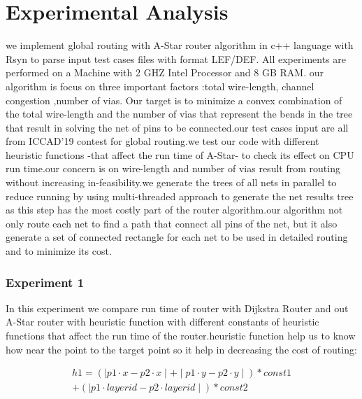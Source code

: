 \documentclass[conference]{IEEEtran}
\begin{document}


\section{Experimental Analysis}

we implement global routing with A-Star router algorithm in c++ language
with Rsyn to parse input test cases files with format LEF/DEF. All
experiments are performed on a Machine with 2 GHZ Intel Processor
and 8 GB RAM. our algorithm is focus on three important factors :total
wire-length, channel congestion ,number of vias. Our target is to
minimize a convex combination of the total wire-length and the number
of vias that represent the bends in the tree that result in solving
the net of pins to be connected.our test cases input are all from
ICCAD'19 contest for global routing.we test our code with different
heuristic functions -that affect the run time of A-Star- to check its
effect on CPU run time.our concern is on wire-length and number of
vias result from routing without increasing in-feasibility.we generate
the trees of all nets in parallel to reduce running by using multi-threaded
approach to generate the net results tree as this step has the most
costly part of the router algorithm.our algorithm not only route each net to find a path that connect all pins of the net, but it also generate a set of connected rectangle for each net to be used in detailed routing and to minimize its cost. 

\subsubsection{Experiment 1}

In this experiment we compare run time of router with Dijkstra Router
and out A-Star router with heuristic function with different constants
of heuristic functions that affect the run time of the router.heuristic
function help us to know how near the point to the target point so it help in decreasing the cost of routing:

\begin{multline*}
h1=(\mid p1\cdot x-p2\cdot x\mid+\mid p1\cdot y-p2\cdot y\mid)*const1\\
+(\mid p1\cdot layerid-p2\cdot layerid\mid)*const2\\
\end{multline*}
\end{document}
